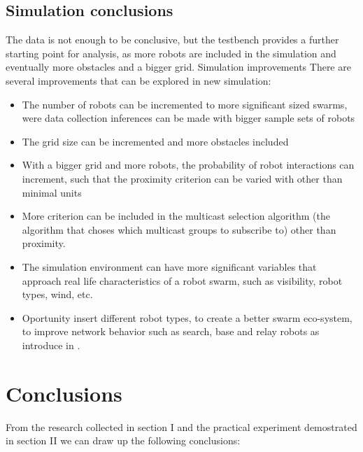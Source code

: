 \documentclass[journal]{IEEEtran}
\begin{document}
\subsection{Simulation conclusions}
The data is not enough to be conclusive, but the testbench provides a further starting point for analysis, as more robots are included in the simulation and eventually more obstacles and a bigger grid. 
Simulation improvements
There are several improvements that can be explored in new simulation:
\begin{itemize}
\item	The number of robots can be incremented to more significant sized swarms, were data collection inferences can be made with bigger sample sets of robots
\item	The grid size can be incremented and more obstacles included
\item	With a bigger grid and more robots, the probability of robot interactions can increment, such that the proximity criterion can be varied with other than minimal units
\item	More criterion can be included in the multicast selection algorithm (the algorithm that choses which multicast groups to subscribe to) other than proximity. 
\item	The simulation environment can have more significant variables that approach real life characteristics of a robot swarm, such as visibility, robot types, wind, etc.
\item	Oportunity insert different robot types, to create a better swarm eco-system, to improve network behavior such as search, base and relay robots as introduce in \cite{IG5}.
\end{itemize}

\section{Conclusions}

From the research collected in section I and the practical experiment demostrated in section II we can draw up the following conclusions:
\end{document}
